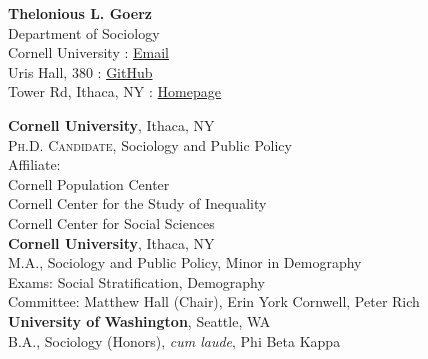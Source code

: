 \documentclass[11pt]{article} %
\begin{document}
{\Large \textbf{Thelonious L. Goerz}} \\


Department of Sociology \\
Cornell University \hfill {} : \href{mailto:theloniouslgoerz@gmail.com}{Email}\\ %
Uris Hall, 380  \hfill {} : \href{https://github.com/theloniousgoerz/}{GitHub}\\ %
Tower Rd, Ithaca, NY \hfill {} : \href{theloniousgoerz.github.io}{Homepage} \\

\vspace{0.001\textheight} %


  \textbf{Cornell University}, Ithaca, NY \\
 \textsc{Ph.D. Candidate}, Sociology and Public Policy \\
 Affiliate: \\
\hspace*{10mm} Cornell Population Center 
\\ \hspace*{10mm} Cornell Center for the Study of Inequality \\
\hspace*{10mm} Cornell Center for Social Sciences \\

  \textbf{Cornell University}, Ithaca, NY \\
 \textsc{M.A.}, Sociology and Public Policy, Minor in Demography \\
\hspace*{10mm} Exams: Social Stratification, Demography\\
Committee: Matthew Hall (Chair), Erin York Cornwell, Peter Rich  \\

 
 \textbf{University of Washington}, Seattle, WA\\
\textsc{B.A.}, Sociology (Honors), \emph{cum laude}, Phi Beta Kappa \\
\end{document}
